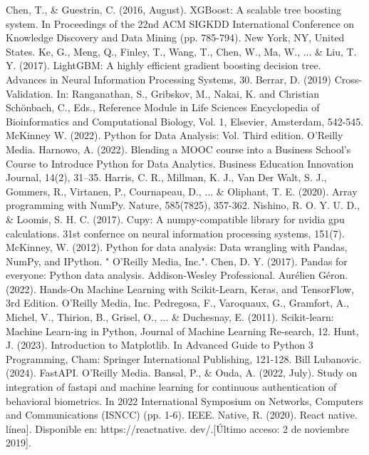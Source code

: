 \documentclass[12pt,a4paper]{article}
\begin{document}
\begin{enumerate}
\begin{thebibliography}{99}
 Chen, T., \& Guestrin, C. (2016, August). XGBoost: A scalable tree boosting system. In Proceedings of the 22nd ACM SIGKDD International Conference on Knowledge Discovery and Data Mining (pp. 785-794). New York, NY, United States.
 Ke, G., Meng, Q., Finley, T., Wang, T., Chen, W., Ma, W., ... \& Liu, T. Y. (2017). LightGBM: A highly efficient gradient boosting decision tree. Advances in Neural Information Processing Systems, 30.
 Berrar, D. (2019) Cross-Validation. In: Ranganathan, S., Gribskov, M., Nakai, K. and Christian Schönbach, C., Eds., Reference Module in Life Sciences Encyclopedia of Bioinformatics and Computational Biology, Vol. 1, Elsevier, Amsterdam, 542-545.
 McKinney W. (2022). Python for Data Analysis: Vol. Third edition. O’Reilly Media.
 Harnowo, A. (2022). Blending a MOOC course into a Business School’s Course to Introduce Python for Data Analytics. Business Education Innovation Journal, 14(2), 31–35.
 Harris, C. R., Millman, K. J., Van Der Walt, S. J., Gommers, R., Virtanen, P., Cournapeau, D., ... \& Oliphant, T. E. (2020). Array programming with NumPy. Nature, 585(7825), 357-362.
 Nishino, R. O. Y. U. D., \& Loomis, S. H. C. (2017). Cupy: A numpy-compatible library for nvidia gpu calculations. 31st confernce on neural information processing systems, 151(7).
 McKinney, W. (2012). Python for data analysis: Data wrangling with Pandas, NumPy, and IPython. " O'Reilly Media, Inc.".
 Chen, D. Y. (2017). Pandas for everyone: Python data analysis. Addison-Wesley Professional.
 Aurélien Géron. (2022). Hands-On Machine Learning with Scikit-Learn, Keras, and TensorFlow, 3rd Edition. O’Reilly Media, Inc.
 Pedregosa, F., Varoquaux, G., Gramfort, A., Michel, V., Thirion, B., Grisel, O., ... \& Duchesnay, E. (2011). Scikit-learn: Machine Learn-ing in Python, Journal of Machine Learning Re-search, 12.
 Hunt, J. (2023). Introduction to Matplotlib. In Advanced Guide to Python 3 Programming, Cham: Springer International Publishing, 121-128.
 Bill Lubanovic. (2024). FastAPI. O’Reilly Media.
 Bansal, P., \& Ouda, A. (2022, July). Study on integration of fastapi and machine learning for continuous authentication of behavioral biometrics. In 2022 International Symposium on Networks, Computers and Communications (ISNCC) (pp. 1-6). IEEE.
 Native, R. (2020). React native. línea]. Disponible en: https://reactnative. dev/.[Último acceso: 2 de noviembre 2019].

\end{thebibliography}
\end{enumerate}
\end{document}
